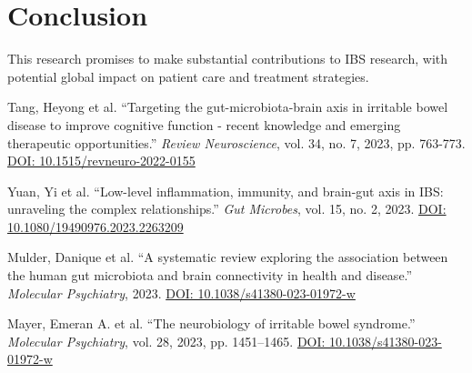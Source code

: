 \documentclass[11pt,a4paper]{article}
\begin{document}
\section{Conclusion}
This research promises to make substantial contributions to IBS research, with potential global impact on patient care and treatment strategies.

\begin{thebibliography}{9}
Tang, Heyong et al. “Targeting the gut-microbiota-brain axis in irritable bowel disease to improve cognitive function - recent knowledge and emerging therapeutic opportunities.” \emph{Review Neuroscience}, vol. 34, no. 7, 2023, pp. 763-773. \href{https://doi.org/10.1515/revneuro-2022-0155}{DOI: 10.1515/revneuro-2022-0155}

Yuan, Yi et al. “Low-level inflammation, immunity, and brain-gut axis in IBS: unraveling the complex relationships.” \emph{Gut Microbes}, vol. 15, no. 2, 2023. \href{https://doi.org/10.1080/19490976.2023.2263209}{DOI: 10.1080/19490976.2023.2263209}

Mulder, Danique et al. “A systematic review exploring the association between the human gut microbiota and brain connectivity in health and disease.” \emph{Molecular Psychiatry}, 2023. \href{https://doi.org/10.1038/s41380-023-01972-w}{DOI: 10.1038/s41380-023-01972-w}

Mayer, Emeran A. et al. “The neurobiology of irritable bowel syndrome.” \emph{Molecular Psychiatry}, vol. 28, 2023, pp. 1451–1465. \href{https://doi.org/10.1038/s41380-023-01972-w}{DOI: 10.1038/s41380-023-01972-w}
\end{thebibliography}
\end{document}
